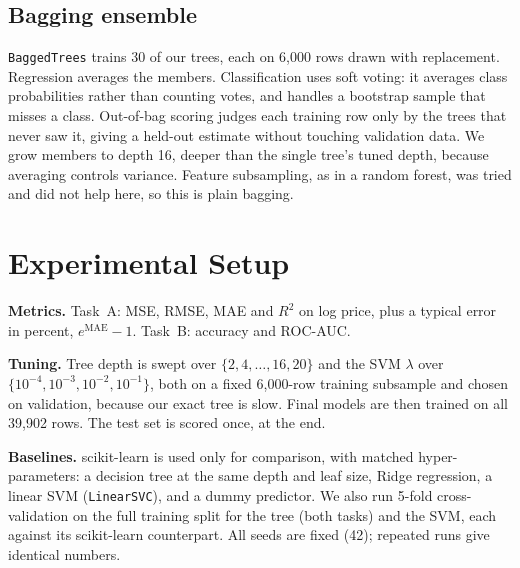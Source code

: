 \subsection{Bagging ensemble}
\texttt{BaggedTrees} trains 30 of our trees, each on 6{,}000 rows drawn with replacement. Regression averages the members. Classification uses soft voting: it averages class probabilities rather than counting votes, and handles a bootstrap sample that misses a class. Out-of-bag scoring judges each training row only by the trees that never saw it, giving a held-out estimate without touching validation data. We grow members to depth 16, deeper than the single tree's tuned depth, because averaging controls variance. Feature subsampling, as in a random forest, was tried and did not help here, so this is plain bagging.

\section{Experimental Setup}
\textbf{Metrics.} Task~A: MSE, RMSE, MAE and $R^2$ on log price, plus a typical error in percent, $e^{\text{MAE}}-1$. Task~B: accuracy and ROC-AUC.

\textbf{Tuning.} Tree depth is swept over $\{2,4,\dots,16,20\}$ and the SVM $\lambda$ over $\{10^{-4},10^{-3},10^{-2},10^{-1}\}$, both on a fixed 6{,}000-row training subsample and chosen on validation, because our exact tree is slow. Final models are then trained on all 39{,}902 rows. The test set is scored once, at the end.

\textbf{Baselines.} scikit-learn is used only for comparison, with matched hyper-parameters: a decision tree at the same depth and leaf size, Ridge regression, a linear SVM (\texttt{LinearSVC}), and a dummy predictor. We also run 5-fold cross-validation on the full training split for the tree (both tasks) and the SVM, each against its scikit-learn counterpart. All seeds are fixed (42); repeated runs give identical numbers.

